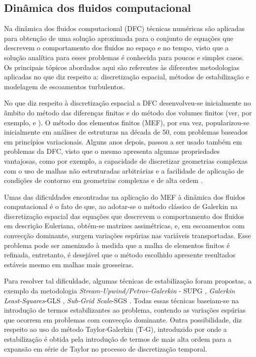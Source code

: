 \documentclass[tese_patricia.tex]{subfiles}
\begin{document}
\subsection{Dinâmica dos fluidos computacional}
\label{cfdsection}

Na dinâmica dos fluidos computacional (DFC) técnicas numéricas são aplicadas para obtenção de uma solução aproximada para o conjunto de equações que descrevem o comportamento dos fluidos no espaço e no tempo, visto que a solução analítica para esses problemas é conhecida para poucos e simples casos. Os principais tópicos abordados aqui são referentes às diferentes metodologias aplicadas no que  diz respeito a: discretização espacial, métodos de estabilização e modelagem de escoamentos turbulentos. 

No que diz respeito à discretização espacial a DFC desenvolveu-se inicialmente no âmbito do método das diferenças finitas e do método dos volumes finitos (ver, por exemplo,  e ). O método dos elementos finitos (MEF), por sua vez, popularizou-se inicialmente em análises de estruturas na década de 50, com problemas baseados em princípios variacionais. Alguns anos depois, passou a ser usado também em problemas da DFC, visto que o mesmo apresenta algumas propriedades vantajosas, como por exemplo, a capacidade de discretizar geometrias complexas com o uso de malhas não estruturadas arbitrárias e a facilidade de aplicação de condições de contorno em geometrias complexas e de alta ordem \cite{ZienkiewiczTN:2005,ReddyG:2000}.

Umas das dificuldades encontradas na aplicação do MEF à dinâmica dos fluidos computacional é o fato de que, ao adotar-se o método clássico de Galerkin na discretização espacial das equações que descrevem o comportamento dos fluidos em descrição Euleriana, obtém-se matrizes assimétricas, e, em escoamentos com convecção dominante, surgem variações espúrias nas variáveis transportadas. Esse problema pode ser amenizado à medida que a malha de elementos finitos é refinada, entretanto, é desejável que o método escolhido apresente resultados estáveis mesmo em malhas mais grosseiras.

Para resolver tal dificuldade, algumas técnicas de estabilização foram propostas, a exemplo da metodologia \textit{Stream-Upwind/Petrov-Galerkin} - SUPG \cite{BrooksH:1982}, \textit{Galerkin Least-Squares}-GLS \cite{HughesFH:1989} , \textit{Sub-Grid Scale}-SGS \cite{Hughes:1995}. Todas essas técnicas baseiam-se na introdução de termos estabilizantes ao problema, contendo as variações espúrias que ocorrem em problemas com convecção dominante. Outra possibilidade, diz respeito ao uso do método Taylor-Galerkin (T-G), introduzido por  onde a estabilização é obtida pela introdução de termos de mais alta ordem para a expansão em série de Taylor no processo de discretização temporal.
\end{document}
